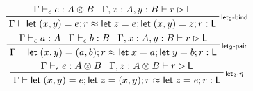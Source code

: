\documentclass[acmsmall,screen,review]{acmart}
\newcommand{\ms}[1]{\ensuremath{\mathsf{#1}}}
\newcommand{\letstmt}[3]{\ensuremath{\ms{let}\;#1 = #2; #3}}
\newcommand{\bhyp}[2]{#1 : #2}
\newcommand{\rle}[1]{{\scriptsize\textsf{#1}}}
\newcommand{\hasty}[4]{#1 \vdash_{#2} #3: {#4}}
\newcommand{\haslb}[3]{#1 \vdash #2 \rhd #3}
\newcommand{\teqv}{\approx}
\newcommand{\lbeq}[4]{#1 \vdash #2 \teqv #3 : {#4}}
\begin{document}
\begin{gather*}
  \prftree[r]{\rle{let$_2$-bind}}
    {\hasty{\Gamma}{\epsilon}{e}{A \otimes B}}
    {\haslb{\Gamma, \bhyp{x}{A}, \bhyp{y}{B}}{r}{\ms{L}}}
    {\lbeq{\Gamma}{\letstmt{(x, y)}{e}{r}}{\letstmt{z}{e}{\letstmt{(x, y)}{z}{r}}}{\ms{L}}}
  \\
  \prftree[r]{\rle{let$_2$-pair}}
    {\hasty{\Gamma}{\epsilon}{a}{A}}
    {\hasty{\Gamma}{\epsilon}{b}{B}}
    {\haslb{\Gamma, \bhyp{x}{A}, \bhyp{y}{B}}{r}{\ms{L}}}
    {\lbeq{\Gamma}{\letstmt{(x, y)}{(a, b)}{r}}{\letstmt{x}{a}{\letstmt{y}{b}{r}}}{\ms{L}}}
  \\
  \prftree[r]{\rle{let$_2$-$\eta$}}
    {\hasty{\Gamma}{\epsilon}{e}{A \otimes B}}
    {\haslb{\Gamma, \bhyp{z}{A \otimes B}}{r}{\ms{L}}}
    {\lbeq{\Gamma}{\letstmt{(x, y)}{e}{\letstmt{z}{(x, y)}{r}}}{\letstmt{z}{e}{r}}{\ms{L}}}
\end{gather*}
\end{document}
